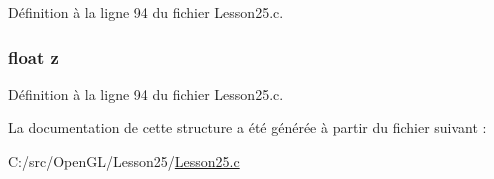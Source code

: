 Définition à la ligne 94 du fichier Lesson25.\+c.

\hypertarget{struct_v_e_r_t_e_x_af73583b1e980b0aa03f9884812e9fd4d}{}
\subsubsection[{z}]{\setlength{\rightskip}{0pt plus 5cm}float z}\label{struct_v_e_r_t_e_x_af73583b1e980b0aa03f9884812e9fd4d}


Définition à la ligne 94 du fichier Lesson25.\+c.



La documentation de cette structure a été générée à partir du fichier suivant \+:\begin{DoxyCompactItemize}
\item 
C\+:/src/\+Open\+G\+L/\+Lesson25/\hyperlink{_lesson25_8c}{Lesson25.\+c}\end{DoxyCompactItemize}
